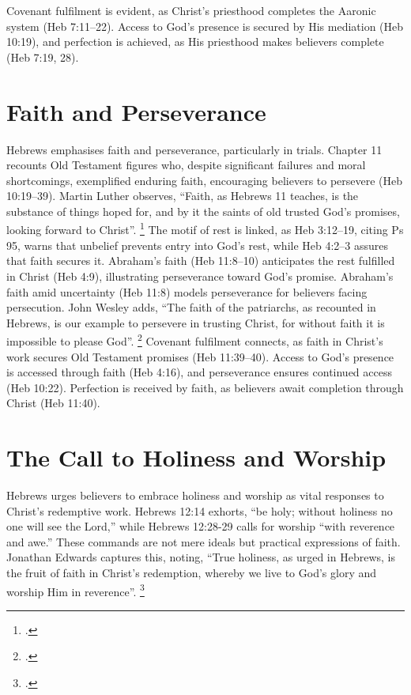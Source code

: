 \documentclass[12pt]{article}
\def\christ{the Messiah}
\def\christ{Christ}
\begin{document}
Covenant fulfilment is evident, as \christ{}’s priesthood completes the Aaronic
system (Heb 7:11--22). Access to God’s presence is secured by His mediation (Heb
10:19), and perfection is achieved, as His priesthood makes believers complete
(Heb 7:19, 28).

\section{Faith and Perseverance}
Hebrews emphasises faith and perseverance, particularly in trials.
%
Chapter 11 recounts Old Testament figures who, despite significant failures and
moral shortcomings, exemplified enduring faith, encouraging believers to
persevere (Heb 10:19--39).
%
Martin Luther observes, ``Faith, as Hebrews 11 teaches, is the substance of
things hoped for, and by it the saints of old trusted God’s promises, looking
forward to Christ''. \footcite[26]{Luther1968}
%
The motif of rest is linked, as Heb 3:12--19, citing Ps 95, warns that unbelief
prevents entry into God’s rest, while Heb 4:2--3 assures that faith secures it.
Abraham’s faith (Heb 11:8--10) anticipates the rest fulfilled in \christ{} (Heb
4:9), illustrating perseverance toward God’s promise.
%
Abraham’s faith amid uncertainty (Heb 11:8) models perseverance for believers
facing persecution.
%
John Wesley adds, ``The faith of the patriarchs, as recounted in Hebrews, is our
example to persevere in trusting Christ, for without faith it is impossible to
please God''. \footcite[Heb 11:6]{Wesley1755}
%
Covenant fulfilment connects, as faith in \christ{}’s work secures Old Testament
promises (Heb 11:39--40).
%
Access to God’s presence is accessed through faith (Heb 4:16), and perseverance
ensures continued access (Heb 10:22).
%
Perfection is received by faith, as believers await completion through \christ{}
(Heb 11:40).

\section{The Call to Holiness and Worship}
Hebrews urges believers to embrace holiness and worship as vital responses to
\christ{}’s redemptive work.
%
Hebrews 12:14 exhorts, ``be holy; without holiness no one will see the Lord,''
while Hebrews 12:28-29 calls for worship ``with reverence and awe.''
%
These commands are not mere ideals but practical expressions of faith.
%
Jonathan Edwards captures this, noting, ``True holiness, as urged in Hebrews, is
the fruit of faith in Christ’s redemption, whereby we live to God’s glory and
worship Him in reverence''. \footcite[2.3]{Edwards1959}
\end{document}
